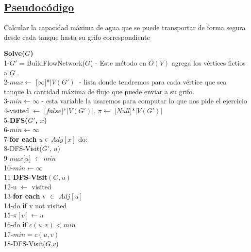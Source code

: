 \documentclass{article}
\begin{document}
    \subsection{\underline{Pseudoc\'odigo}}
    \begin{algorithm}[H]
        \caption{Calcular la capacidad m\'axima de agua que se puede transportar de forma segura desde cada tanque hasta su grifo correspondiente}
        \textbf{Solve($G$)\\}
        1-\hspace*{1em}$G'$ = Build\textunderscore Flow\textunderscore Network($G$) - Este m\'etodo en $O(V)$ agrega los v\'ertices fictios a $G$ .\\
        2-\hspace*{1em}$max \leftarrow$ [$\infty]$*$|V(G')|$ - lista donde tendremos para cada v\'ertice que sea tanque la cantidad m\'axima de flujo que puede enviar a su grifo.\\
        3-\hspace*{1em}$min \leftarrow \infty$ - esta variable la usaremos para computar lo que nos pide el ejercicio\\
        4-\hspace*{1em}visited $\leftarrow$ [$false$]*$|V(G')|$, $\pi \leftarrow$ [$Null$]*$|V(G')|$\\
    
        5-\hspace*{1em}\textbf{DFS($G'$, $x$)}\\
        6-\hspace*{2em}$min \leftarrow \infty$\\
        7-\hspace*{2em}\textbf{for each} $u \in Ady[x]$ do:\\
        8-\hspace*{3em}DFS-Visit($G'$, $u$)\\
        9-\hspace*{3em}$max$[$u$] $\leftarrow min$\\
        10-\hspace*{3em}$min \leftarrow \infty$\\

        11-\hspace*{1em}\textbf{DFS-Visit$(G,u)$}\\ 
        12-\hspace*{2em}u $\leftarrow$ visited \\  
        13-\hspace*{2em}\textbf{for each} v $\in$ $Adj[u]$\\
        14-\hspace*{3em}do \textbf{if} v not visited\\
        15-\hspace*{4em}$\pi[v] \leftarrow u$\\
        16-\hspace*{4em}do \textbf{if} $c(u,v)< min$\\
        17-\hspace*{5em}$min=c(u,v)$\\
        18-\hspace*{4em}DFS-Visit($G$,$v$)\\
        

\end{algorithm}
\end{document}
